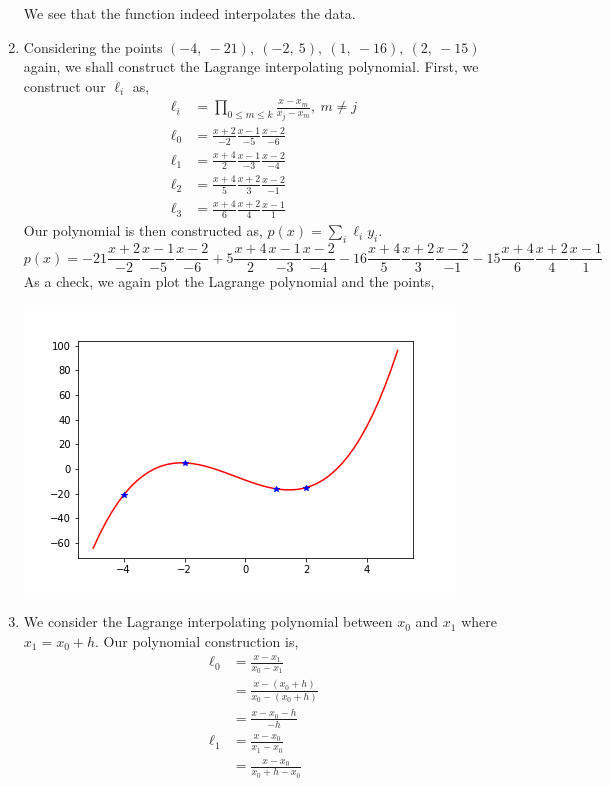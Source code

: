 \documentclass[letterpaper,10pt]{article}
\begin{document}
\begin{enumerate}
\begin{center}
\end{center}
We see that the function indeed interpolates the data.
\item Considering the points $(-4,\ -21),\ (-2,\ 5),\ (1,\ -16),\ (2,\ -15)$ again, we shall construct the Lagrange interpolating polynomial. First, we construct our $\ell_i$ as,
\begin{align*}
\ell_i &= \prod_{0\leq m \leq k}\frac{x-x_m}{x_j-x_m},\ m\neq j\\
\ell_0 &= \frac{x+2}{-2}\frac{x-1}{-5}\frac{x-2}{-6}\\
\ell_1 &= \frac{x+4}{2}\frac{x-1}{-3}\frac{x-2}{-4}\\
\ell_2 &= \frac{x+4}{5}\frac{x+2}{3}\frac{x-2}{-1}\\
\ell_3 &= \frac{x+4}{6}\frac{x+2}{4}\frac{x-1}{1}
\end{align*}
Our polynomial is then constructed as, $p(x)=\sum_i \ell_iy_i$.
\[p(x)=-21\frac{x+2}{-2}\frac{x-1}{-5}\frac{x-2}{-6}+5\frac{x+4}{2}\frac{x-1}{-3}\frac{x-2}{-4}-16\frac{x+4}{5}\frac{x+2}{3}\frac{x-2}{-1}-15\frac{x+4}{6}\frac{x+2}{4}\frac{x-1}{1}\]
As a check, we again plot the Lagrange polynomial and the points,
\begin{center}
\includegraphics[scale=.7]{3.png}
\end{center}
\item We consider the Lagrange interpolating polynomial between $x_0$ and $x_1$ where $x_1=x_0+h$. Our polynomial construction is,
\begin{align*}
\ell_0 &= \frac{x-x_1}{x_0-x_1}\\
&= \frac{x-(x_0+h)}{x_0-(x_0+h)}\\
&= \frac{x-x_0-h}{-h}\\
\ell_1 &= \frac{x-x_0}{x_1-x_0}\\
&=\frac{x-x_0}{x_0+h-x_0}\\

\end{align*}
\end{enumerate}
\end{document}

